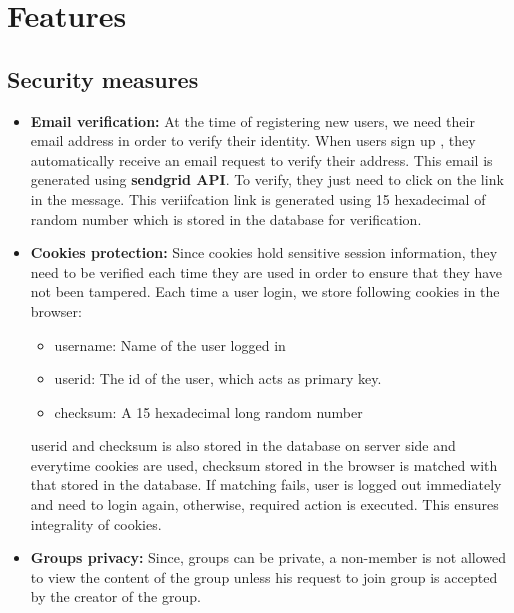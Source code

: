 \documentclass{article}
\begin{document}
\section{Features}
\subsection{Security measures}
\begin{itemize}
\item \textbf{Email verification:} At the time of registering new users, we need their email address in order to verify their identity. When users sign up , they automatically receive an email request to verify their address. This email is generated using \textbf{sendgrid API}\cite{sendgrid}. To verify, they just need to click on the link in the message. This veriifcation link is generated using 15 hexadecimal of random number which is stored in the database for verification.
\item \textbf{Cookies protection:} Since cookies hold sensitive session information, they need to be verified each time they are used in order to ensure that they have not been tampered. Each time a user login, we store following cookies in the browser:
\begin{itemize}
\item username: Name of the user logged in
\item userid: The id of the user, which acts as primary key.
\item checksum: A 15 hexadecimal long random number
\end{itemize}
userid and checksum is also stored in the database on server side and everytime cookies are used, checksum stored in the browser is matched with that stored in the database. If matching fails, user is logged out immediately and need to login again, otherwise, required action is executed. This ensures integrality of cookies. 
\item \textbf{Groups privacy:} Since, groups can be private, a non-member is not allowed to view the content of the group unless his request to join group is accepted by the creator of the group.
\end{itemize}
\end{document}
